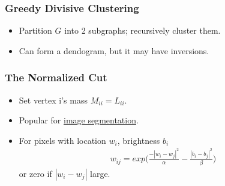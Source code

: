 \documentclass[10pt]{article}
\begin{document}
	\subsubsection*{Greedy Divisive Clustering}
	\begin{itemize}
		\item Partition $G$ into 2 subgraphs; recursively cluster them.
		\item Can form a dendogram, but it may have inversions.
	\end{itemize}
	\subsubsection*{The Normalized Cut}
	\begin{itemize}
		\item Set vertex i's mass $M_{ii} = L_{ii}$.
		\item Popular for \underline{image segmentation}.
		\item For pixels with location $w_{i}$, brightness $b_{i}$
			\begin{align*}
				w_{ij} = exp\bigg(\frac{-|w_{i} - w_{j}|^{2}}{\alpha} - \frac{|b_{i} - b_{j}|^{2}}{\beta}\bigg)
			\end{align*}
			or zero if $|w_{i} - w_{j}|$ large.
	\end{itemize}
\end{document}
